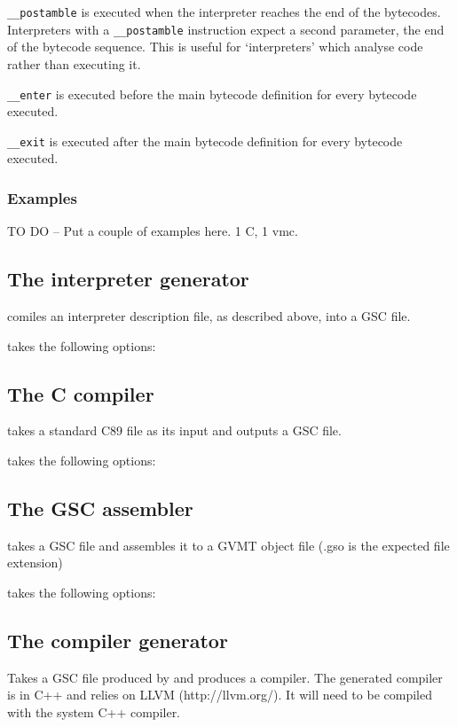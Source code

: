 \verb|__postamble| is executed when the interpreter reaches the end of the bytecodes. Interpreters with a \verb|__postamble| instruction expect a second parameter, the end of the bytecode sequence. This is useful for `interpreters' which analyse code rather than executing it.

\verb|__enter| is executed before the main bytecode definition for every bytecode executed.

\verb|__exit| is executed after the main bytecode definition for every bytecode executed.


\subsubsection*{Examples}


TO DO -- Put a couple of examples here. 1 C, 1 vmc.



\subsection{The interpreter generator \gvmtic{}\label{sect:gvmtic}}
\gvmtic{} comiles an interpreter description file, as described above, into a GSC file.

\gvmtic{} takes the following options:



\subsection{The C compiler \gvmtc{}\label{sect:gvmtc}}
\gvmtc{} takes a standard C89 file as its input and outputs a GSC file.

\gvmtc{} takes the following options:



\subsection{The GSC assembler \gvmtas{}\label{sect:gvmtas}}
\gvmtas{} takes a GSC file and assembles it to a GVMT object file (.gso is the expected file extension)

\gvmtas{} takes the following options:



\subsection{The compiler generator \gvmtcc{}\label{sect:gvmtcc}}
\gvmtcc{} Takes a GSC file produced by \gvmtic{} and produces a compiler. The generated compiler is in C++ and relies on LLVM (http://llvm.org/).
It will need to be compiled with the system C++ compiler.

